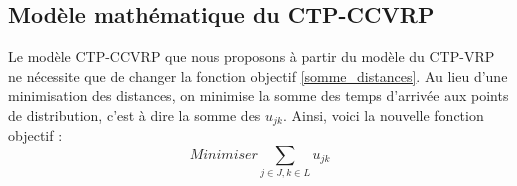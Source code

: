\documentclass[5p,authoryear]{elsarticle}
\begin{document}
\subsection{Modèle mathématique du CTP-CCVRP} \label{modele_ctpccvrp}
Le modèle CTP-CCVRP que nous proposons à partir du modèle du CTP-VRP ne nécessite que de changer la fonction objectif \cref{somme_distances}. Au lieu d'une minimisation des distances, on minimise la somme des temps d'arrivée aux points de distribution, c'est à dire la somme des $u_{jk}$. Ainsi, voici la nouvelle fonction objectif :
\begin{equation} \label{somme_temps_arrivee}
Minimiser \sum_{j \in J, k \in L} u_{jk}
\end{equation}


\end{document}
